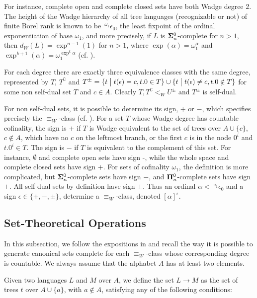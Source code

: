 For instance, complete open and complete closed sets have both Wadge degree 2. %
The
height of the Wadge hierarchy of all tree languages (recognizable or
not) of finite Borel rank is known to be $\,{}^{\omega_1} \epsilon_0$, 
the least fixpoint of the 
ordinal exponentiation of base $\omega_1$, and more precisely, if $L$ is ${\bf
  \Sigma}^0_n$-complete for $n>1$, then $d_W(L) = \exp^{n-1}(1)$ for $n>1$, where $\exp(\alpha) = \omega_1^\alpha$ and $\exp^{k+1}(\alpha) = \omega_1^{\exp^k{\alpha}}$ (cf. \cite{dup1}).

For each degree there are exactly three equivalence
classes with the same degree, represented by $T$, $T^\complement$ and
$T^\pm = \{t \bigm | t(\epsilon) = c, t.0\in T \} \cup  \{t \bigm |
t(\epsilon) \neq c, t.0\notin T \}$ for some non self-dual set $T$ and
$c\in A$. Clearly $T, T^\complement <_W U^\pm$ and
$T^\pm$ is self-dual.

For non self-dual sets, it is possible to determine its sign, $+$
or $-$, which specifies precisely the $\equiv_W$-class
(cf. \cite{dup1}). For a set $T$ whose Wadge degree has countable cofinality, the sign
is $+$ if $T$ is Wadge equivalent to the set of trees over $A
\cup \{c\}$, $c\notin A$, which have no $c$ on the leftmost
branch, or the first $c$ is in the node $0^i$ and $t.0^i \in T$. The
sign is $-$ if $T$ is equivalent to the complement of this set. 
For instance, $\emptyset$ and complete open sets have sign -,
while the whole space and complete closed  sets have sign $+$.
For sets of cofinality $\omega_1$, the definition is more complicated, but
${\bf \Sigma}^0_n$-complete sets have sign $-$, and ${\bf
  \Pi}^0_n$-complete sets have sign $+$. All self-dual sets by
definition have sign $\pm$. Thus an ordinal $\alpha <\,
{}^{\omega_1}\epsilon_0$ and a sign $\epsilon \in \{+,-,\pm\}$,
determine a $\equiv_W$-class, denoted  $[\alpha]^\epsilon$. 



\subsection{Set-Theoretical Operations}
In this subsection, we follow the expositions in \cite{dup1,dup3} and recall the way it is possible to generate canonical sets complete for each $\equiv_W$-class whose corresponding degree is countable. We always assume that the alphabet $A$ has at least two elements.

\vspace{0.2cm}
Given two languages $L$ and $M$ over $A$, we define
 the set $L \to M$ as the set of trees $t$ over $A \cup\{a\}$, with $a \notin A$, satisfying any of the following conditions:

